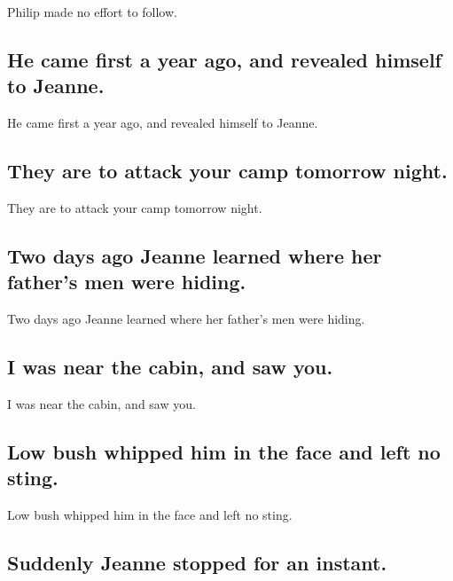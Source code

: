 \documentclass[]{article}
\begin{document}
Philip made no effort to follow.

\hypertarget{he-came-first-a-year-ago-and-revealed-himself-to-jeanne.}{%
\subsection{He came first a year ago, and revealed himself to
Jeanne.}\label{he-came-first-a-year-ago-and-revealed-himself-to-jeanne.}}

He came first a year ago, and revealed himself to Jeanne.

\hypertarget{they-are-to-attack-your-camp-tomorrow-night.}{%
\subsection{They are to attack your camp tomorrow
night.}\label{they-are-to-attack-your-camp-tomorrow-night.}}

They are to attack your camp tomorrow night.

\hypertarget{two-days-ago-jeanne-learned-where-her-fathers-men-were-hiding.}{%
\subsection{Two days ago Jeanne learned where her father's men were
hiding.}\label{two-days-ago-jeanne-learned-where-her-fathers-men-were-hiding.}}

Two days ago Jeanne learned where her father's men were hiding.

\hypertarget{i-was-near-the-cabin-and-saw-you.}{%
\subsection{I was near the cabin, and saw
you.}\label{i-was-near-the-cabin-and-saw-you.}}

I was near the cabin, and saw you.

\hypertarget{low-bush-whipped-him-in-the-face-and-left-no-sting.}{%
\subsection{Low bush whipped him in the face and left no
sting.}\label{low-bush-whipped-him-in-the-face-and-left-no-sting.}}

Low bush whipped him in the face and left no sting.

\hypertarget{suddenly-jeanne-stopped-for-an-instant.}{%
\subsection{Suddenly Jeanne stopped for an
instant.}\label{suddenly-jeanne-stopped-for-an-instant.}}
\end{document}
